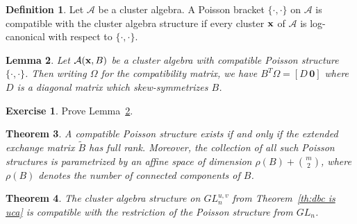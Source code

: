\documentclass{amsart}
\newtheorem{theorem}{Theorem}[section]
\newtheorem{lemma}[theorem]{Lemma}
\theoremstyle{definition}
\newtheorem{definition}[theorem]{Definition}
\newtheorem{subexercise}{Exercise}[theorem]
\theoremstyle{remark}
\numberwithin{equation}{section}
\newcommand{\cA}{{\mathcal{A}}}
\newcommand{\bx}{{\bf x}}
\begin{document}
  \begin{definition}
    Let $\cA$ be a cluster algebra.  A Poisson bracket $\{\cdot,\cdot\}$ on $\cA$ is compatible with the cluster algebra structure if every cluster $\bx$ of $\cA$ is log-canonical with respect to $\{\cdot,\cdot\}$.
  \end{definition}

  \begin{lemma}
  \label{le:compatibility}
    Let $\cA(\bx,B)$ be a cluster algebra with compatible Poisson structure $\{\cdot,\cdot\}$.  Then writing $\Omega$ for the compatibility matrix, we have $B^T\Omega=[D\, \boldsymbol{0}]$ where $D$ is a diagonal matrix which skew-symmetrizes $B$.
  \end{lemma}
  \begin{subexercise}
    Prove Lemma~\ref{le:compatibility}. 
  \end{subexercise}

  \begin{theorem}\cite{GSV03}
    A compatible Poisson structure exists if and only if the extended exchange matrix $\tilde B$ has full rank.  Moreover, the collection of all such Poisson structures is parametrized by an affine space of dimension $\rho(B)+{m\choose 2}$, where $\rho(B)$ denotes the number of connected components of $B$.
  \end{theorem}

  \begin{theorem}\cite{GSV10}
    The cluster algebra structure on $GL_n^{u,v}$ from Theorem~\ref{th:dbc is uca} is compatible with the restriction of the Poisson structure from $GL_n$.
  \end{theorem}
\end{document}

